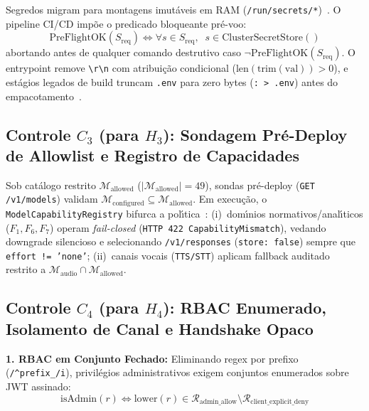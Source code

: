 \documentclass[10pt,twocolumn]{article}
\begin{document}
Segredos migram para montagens imut\'{a}veis em RAM (\texttt{/run/secrets/*})~\cite{R18}. O pipeline CI/CD imp\~{o}e o predicado bloqueante pr\'{e}-voo:
\begin{equation}
\mathrm{PreFlightOK}(S_{\mathrm{req}}) \iff \forall s \in S_{\mathrm{req}}, \;\; s \in \mathrm{ClusterSecretStore}()
\end{equation}
abortando antes de qualquer comando destrutivo caso $\neg \mathrm{PreFlightOK}(S_{\mathrm{req}})$. O entrypoint remove \texttt{\textbackslash r\textbackslash n} com atribui\c{c}\~{a}o condicional ($\mathrm{len}(\mathrm{trim}(\mathrm{val})) > 0$), e est\'{a}gios legados de build truncam \texttt{.env} para zero bytes (\texttt{: > .env}) antes do empacotamento~\cite{R15,R21}.

\subsection{Controle $C_3$ (para $H_3$): Sondagem Pr\'{e}-Deploy de Allowlist e Registro de Capacidades}

Sob cat\'{a}logo restrito $\mathcal{M}_{\mathrm{allowed}}$ ($|\mathcal{M}_{\mathrm{allowed}}| = 49$), sondas pr\'{e}-deploy (\texttt{GET /v1/models}) validam $\mathcal{M}_{\mathrm{configured}} \subseteq \mathcal{M}_{\mathrm{allowed}}$. Em execu\c{c}\~{a}o, o \texttt{ModelCapabilityRegistry} bifurca a pol\'{\i}tica~\cite{R24,R29}: (i)~dom\'{\i}nios normativos/anal\'{\i}ticos ($F_1, F_6, F_7$) operam \emph{fail-closed} (\texttt{HTTP 422 CapabilityMismatch}), vedando downgrade silencioso e selecionando \texttt{/v1/responses} (\texttt{store: false}) sempre que \texttt{effort != 'none'}; (ii)~canais vocais (\texttt{TTS/STT}) aplicam fallback auditado restrito a $\mathcal{M}_{\mathrm{audio}} \cap \mathcal{M}_{\mathrm{allowed}}$.

\subsection{Controle $C_4$ (para $H_4$): RBAC Enumerado, Isolamento de Canal e Handshake Opaco}

\textbf{1. RBAC em Conjunto Fechado:} Eliminando regex por prefixo (\texttt{/\^{}prefix\_/i}), privil\'{e}gios administrativos exigem conjuntos enumerados sobre JWT assinado:
\begin{equation}
\mathrm{isAdmin}(r) \iff \mathrm{lower}(r) \in \mathcal{R}_{\mathrm{admin\_allow}} \setminus \mathcal{R}_{\mathrm{client\_explicit\_deny}}
\end{equation}
\end{document}

